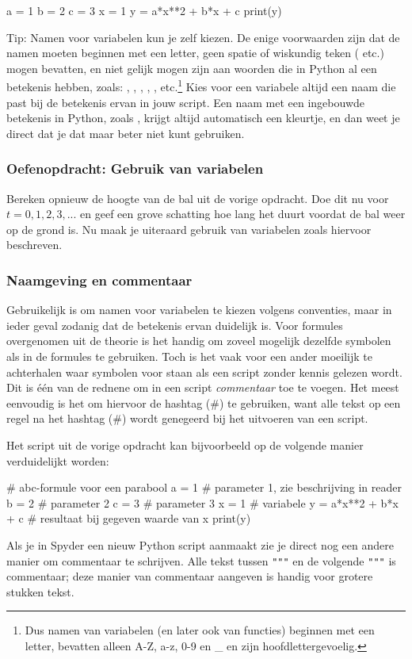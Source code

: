 \documentclass[a4paper,11pt, fleqn]{article}
\begin{document}
\begin{python}
a = 1
b = 2
c = 3
x = 1
y = a*x**2 + b*x + c
print(y)
\end{python}

Tip: Namen voor variabelen kun je zelf kiezen. De enige voorwaarden zijn dat de namen moeten beginnen met een letter, geen spatie of wiskundig teken (\pythoninline{+ * /} etc.) mogen bevatten, en niet gelijk mogen zijn aan woorden die in  Python al een betekenis hebben, zoals: , , , , , etc.\footnote{Dus namen van  variabelen (en later ook van functies) beginnen met een letter, bevatten alleen A-Z, a-z, 0-9 en \_ en zijn hoofdlettergevoelig.} Kies voor een variabele altijd een naam die past bij de betekenis ervan in jouw script. Een naam met een ingebouwde betekenis in Python, zoals , krijgt altijd automatisch een kleurtje, en dan weet je direct dat je dat maar beter niet kunt gebruiken.

\subsubsection*{Oefenopdracht: Gebruik van variabelen} Bereken opnieuw de hoogte van de bal uit de vorige opdracht. Doe dit nu voor $t = 0,1,2,3, ... $ en geef een grove schatting hoe lang het duurt voordat de bal weer op de grond is. Nu maak je uiteraard gebruik van variabelen zoals hiervoor beschreven.

\subsubsection{Naamgeving en commentaar}
Gebruikelijk is om namen voor variabelen te kiezen volgens conventies, maar in ieder geval zodanig dat de betekenis ervan duidelijk is.
Voor formules overgenomen uit de theorie is het handig om zoveel mogelijk dezelfde symbolen als in de formules te gebruiken. 
Toch is het vaak voor een ander moeilijk te achterhalen waar symbolen voor staan als een script zonder kennis gelezen wordt. 
Dit is \'e\'en van de rednene om in een script \textit{commentaar} toe te voegen. 
Het meest eenvoudig is het om hiervoor de hashtag ($\#$) te gebruiken, want alle tekst op een regel na het hashtag ($\#$) wordt genegeerd bij het uitvoeren van een script. 

Het script uit de vorige opdracht kan bijvoorbeeld op de volgende manier verduidelijkt worden:
\begin{python}
# abc-formule voor een parabool
a = 1 # parameter 1, zie beschrijving in reader
b = 2 # parameter 2
c = 3 # parameter 3
x = 1 # variabele
y = a*x**2 + b*x + c # resultaat bij gegeven waarde van x 
print(y)
\end{python}
Als je in Spyder een nieuw Python script aanmaakt zie je direct nog een andere manier om commentaar te schrijven. Alle tekst tussen \verb,""", en de volgende \verb,""", is commentaar; deze manier van commentaar aangeven is handig voor grotere stukken tekst. 
\end{document}
